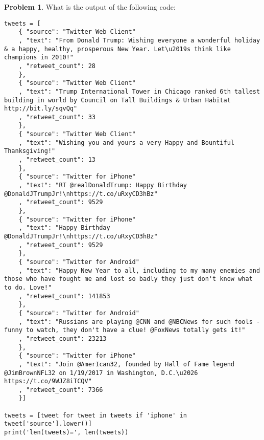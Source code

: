 \documentclass[10pt]{article}
\theoremstyle{definition}
\newtheorem{problem}{Problem}
\begin{document}
\newpage
\begin{problem}
    What is the output of the following code:
\end{problem}
\begin{lstlisting}
tweets = [
    { "source": "Twitter Web Client"
    , "text": "From Donald Trump: Wishing everyone a wonderful holiday & a happy, healthy, prosperous New Year. Let\u2019s think like champions in 2010!"
    , "retweet_count": 28
    }, 
    { "source": "Twitter Web Client"
    , "text": "Trump International Tower in Chicago ranked 6th tallest building in world by Council on Tall Buildings & Urban Habitat http://bit.ly/sqvQq"
    , "retweet_count": 33
    },
    { "source": "Twitter Web Client"
    , "text": "Wishing you and yours a very Happy and Bountiful Thanksgiving!"
    , "retweet_count": 13
    },
    { "source": "Twitter for iPhone"
    , "text": "RT @realDonaldTrump: Happy Birthday @DonaldJTrumpJr!\nhttps://t.co/uRxyCD3hBz"
    , "retweet_count": 9529
    },
    { "source": "Twitter for iPhone"
    , "text": "Happy Birthday @DonaldJTrumpJr!\nhttps://t.co/uRxyCD3hBz"
    , "retweet_count": 9529
    },
    { "source": "Twitter for Android"
    , "text": "Happy New Year to all, including to my many enemies and those who have fought me and lost so badly they just don't know what to do. Love!"
    , "retweet_count": 141853
    },
    { "source": "Twitter for Android"
    , "text": "Russians are playing @CNN and @NBCNews for such fools - funny to watch, they don't have a clue! @FoxNews totally gets it!"
    , "retweet_count": 23213
    },
    { "source": "Twitter for iPhone"
    , "text": "Join @AmerIcan32, founded by Hall of Fame legend @JimBrownNFL32 on 1/19/2017 in Washington, D.C.\u2026 https://t.co/9WJZ8iTCQV"
    , "retweet_count": 7366
    }]

tweets = [tweet for tweet in tweets if 'iphone' in tweet['source'].lower()]
print('len(tweets)=', len(tweets))
\end{lstlisting}
\vspace{1.5in}
\end{document}
